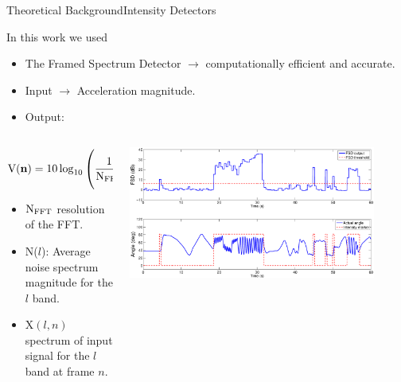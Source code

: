 \documentclass[10pt,aspectratio=1610]{beamer}
\begin{document}
\begin{frame}{Theoretical Background}{Intensity Detectors}
\begin{block}{In this work we used}
\begin{itemize}
	\item The Framed Spectrum Detector $\rightarrow$ computationally efficient and accurate.
	\item Input $\rightarrow$ Acceleration magnitude.
	\item Output:
\end{itemize}
\begin{columns}
	\begin{column}{.5\linewidth}
		\small
		\begin{equation}
		\mbox{V}(\mathbf{n})=10\log_{10}\left(\frac{1}{\mbox{N}_{\scriptsize 	\mbox{FFT}}}\sum_{l=0}^{\mbox{N}_{\scriptsize \mbox{FFT}}-1}\frac{\mbox{X}^{2}(l,n)}{\mbox{N}^{2}(l)}\right)
		\label{eq:fsd}
		\nonumber
		\end{equation}
		\normalsize
		\begin{itemize}
			\item $\mbox{N}_{\scriptsize \mbox{FFT}}$ resolution of the FFT.
			\item N($l$): Average noise spectrum magnitude for the $l$ band.
			\item $\mbox{X}(l,n)$ spectrum of input signal for the $l$ band at frame $n$.
		\end{itemize}
	\end{column}
	\begin{column}{.5\linewidth}
		\centering
		\includegraphics[width=0.88\textwidth]{AAUgraphics/FSD_output.eps}
	\end{column}
\end{columns}

\end{block}
\end{frame}
\end{document}
